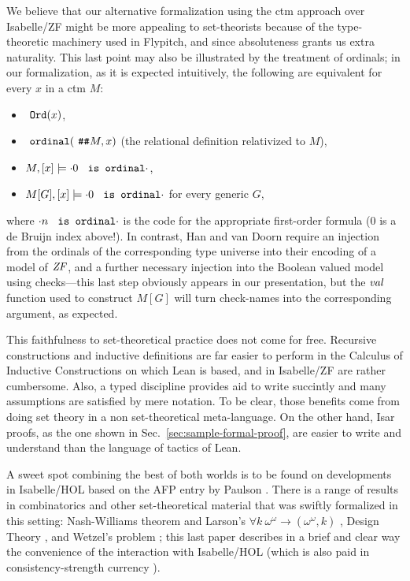 We believe that our alternative formalization using the ctm approach
over Isabelle/ZF might be more appealing to set-theorists because of the
type-theoretic machinery used in Flypitch, and %
since absoluteness grants us extra naturality. This last point may also
be illustrated by the treatment of ordinals; in our formalization, as
it is expected intuitively, the following are equivalent for every $x$
in a ctm $M$:
\begin{itemize}
\item $\isatt{Ord}(x)$,
\item $\isatt{ordinal}(\isatt{\#\#}M,x)$ (the relational
  definition relativized to $M$),
\item
  $M,[x] \models {\cdot}0\isatt{ is ordinal}{\cdot}$,
\item
  $M[G], [x] \models {\cdot}0\isatt{ is ordinal}{\cdot}$ for every generic $G$,
\end{itemize}
where ${\cdot}n\isatt{ is ordinal}{\cdot}$ is the code for the
appropriate first-order formula  ($0$ is a de
Bruijn index above!). In contrast, Han and van Doorn require an
injection from the ordinals of the corresponding type universe into
their encoding of a model of $\mathit{ZF}$, and a further necessary injection into the Boolean
valued model using checks---this last step obviously appears in our
presentation, but the $\operatorname{\mathit{val}}$ function used to construct $M[G]$ will turn
check-names into the corresponding argument, as expected.

This faithfulness to set-theoretical practice does not come for
free. Recursive constructions and inductive definitions are far easier
to perform in the Calculus of Inductive Constructions on which Lean
is based, and in Isabelle/ZF are rather cumbersome. Also, a
typed discipline provides aid to write succintly and many assumptions
are satisfied by mere notation. To be clear, those benefits come from
doing set theory in a non set-theoretical meta-language. On the other
hand, Isar proofs, as the one shown in
Sec.~\ref{sec:sample-formal-proof}, are easier to write and understand
than the language of tactics of Lean.

A sweet spot combining the best of both worlds is to be found on
developments in Isabelle/HOL based on the AFP entry
 by Paulson \cite{ZFC_in_HOL-AFP}. There is a
range of results in combinatorics and other set-theoretical material
that was swiftly formalized in this setting: Nash-Williams theorem and
Larson's $\forall k\ \omega^{\omega}\longrightarrow(\omega^\omega,k)$
\cite{doi:10.1080/10586458.2021.1980464}, Design Theory
\cite{10.1007/978-3-030-81097-9_1}, and Wetzel's problem
\cite{2022arXiv220503159P}; this last paper describes in a brief and
clear way the convenience of the interaction with Isabelle/HOL
(which is also paid in consistency-strength currency
\cite[Sect.~3]{DBLP:conf/ictac/Obua06}).

